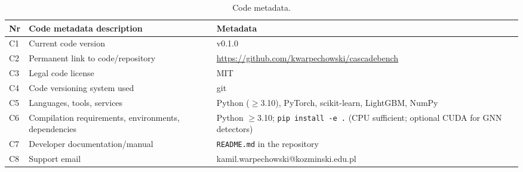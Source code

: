 \begin{table}[H]
\centering
\caption{Code metadata.}
\label{tab:codemeta}
\small
\begin{tabular}{@{}p{0.5cm}p{5.0cm}p{7.8cm}@{}}
\toprule
\textbf{Nr} & \textbf{Code metadata description} & \textbf{Metadata} \\
\midrule
C1 & Current code version & v0.1.0 \\
C2 & Permanent link to code/repository & \url{https://github.com/kwarpechowski/cascadebench} \\
C3 & Legal code license & MIT \\
C4 & Code versioning system used & git \\
C5 & Languages, tools, services & Python ($\geq$3.10), PyTorch, scikit-learn, LightGBM, NumPy \\
C6 & Compilation requirements, environments, dependencies & Python $\geq$3.10; \texttt{pip install -e .} (CPU sufficient; optional CUDA for GNN detectors) \\
C7 & Developer documentation/manual & \texttt{README.md} in the repository \\
C8 & Support email & kamil.warpechowski@kozminski.edu.pl \\
\bottomrule
\end{tabular}
\end{table}